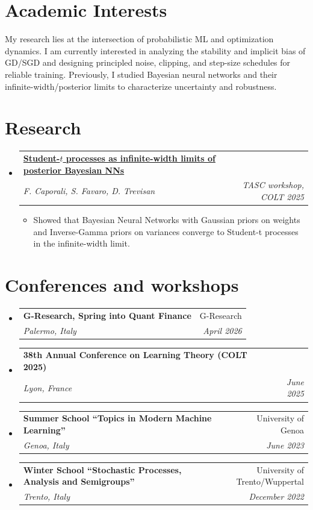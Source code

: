 \documentclass[a4paper, 11pt]{article}
\makeatletter
\newcommand{\cvitemstart}{\begin{itemize}}
\newcommand{\cvitemend}{\end{itemize}\vspace{-5pt}}
\newcommand{\cvitem}[1]{%
			\item \small{{#1 \vspace{-1pt}}}
		}
\newcommand{\cvsubheadingstart}{%
			\begin{itemize}[leftmargin = 0cm, label = {}]
		}
\newcommand{\cvsubheadingend}{\end{itemize}}
\newcommand{\cvsubheading}[4]{
			\vspace{-4pt}
			\item
				\begin{tabular*}{\textwidth}[t]{l@{\extracolsep{\fill}}r}
					\textbf{#1} & #2 \\
					\textit{\small #3} & \textit{\small #4} \\
				\end{tabular*}\vspace{-7pt}
		}
\newcommand{\cvresearchheading}[3]{
			\vspace{-4pt}
			\item
				\begin{tabular*}{\textwidth}{l@{\extracolsep{\fill}}r}
					\textbf{#1} & \\
					\textit{\small #2} & \textit{\small #3} \\  
				\end{tabular*}\vspace{-7pt}
		}
\makeatother
\begin{document}
	\section{Academic Interests}
		\begin{itemize}[leftmargin = 0cm, label = {}]
			\small{\item{
			My research lies at the intersection of probabilistic ML and optimization dynamics. 
			I am currently interested in analyzing the stability and implicit bias of GD/SGD and designing principled noise, clipping, and step-size schedules for reliable training. 
			Previously, I studied Bayesian neural networks and their infinite-width/posterior limits to characterize uncertainty and robustness.
			}}
		\end{itemize}
		\vspace{-18pt}

	\section{Research}
		\cvsubheadingstart
			\cvresearchheading{\href{https://openreview.net/pdf?id=iUppQcPAMK}{Student-\texorpdfstring{$t$}{t} processes as infinite-width limits of posterior Bayesian NNs}}%
				{\textit{F. Caporali}, S. Favaro, D. Trevisan}%
				{TASC workshop, COLT 2025}%
				\cvitemstart
					\cvitem{Showed that Bayesian Neural Networks with Gaussian priors on weights and Inverse-Gamma priors on variances converge to Student-t processes in the infinite-width limit.}
				\cvitemend
		\cvsubheadingend
		\vspace{-17pt}

	\section{Conferences and workshops}
		\cvsubheadingstart
			\cvsubheading{G-Research, Spring into Quant Finance}%
				{G-Research}%
				{Palermo, Italy}%
				{April 2026}
			\cvsubheading{38th Annual Conference on Learning Theory (COLT 2025)}%
				{}%
				{Lyon, France}%
				{June 2025}
			\cvsubheading{Summer School ``Topics in Modern Machine Learning''}%
				{University of Genoa}%
				{Genoa, Italy}%
				{June 2023}
			\cvsubheading{Winter School ``Stochastic Processes, Analysis and Semigroups''}%
				{University of Trento/Wuppertal}%
				{Trento, Italy}%
				{December 2022}
		\cvsubheadingend
		\vspace{-13pt}
\end{document}
